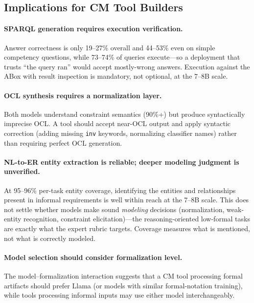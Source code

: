 \documentclass[runningheads]{llncs}
\begin{document}
\subsection{Implications for CM Tool Builders}

\paragraph{SPARQL generation requires execution verification.} Answer correctness is only 19--27\% overall and 44--53\% even on simple competency questions, while 73--74\% of queries execute---so a deployment that trusts ``the query ran'' would accept mostly-wrong answers. Execution against the ABox with result inspection is mandatory, not optional, at the 7--8B scale.

\paragraph{OCL synthesis requires a normalization layer.} Both models understand constraint semantics (90\%+) but produce syntactically imprecise OCL. A tool should accept near-OCL output and apply syntactic correction (adding missing \texttt{inv} keywords, normalizing classifier names) rather than requiring perfect OCL generation.

\paragraph{NL-to-ER entity extraction is reliable; deeper modeling judgment is unverified.} At 95--96\% per-task entity coverage, identifying the entities and relationships present in informal requirements is well within reach at the 7--8B scale. This does not settle whether models make sound \emph{modeling} decisions (normalization, weak-entity recognition, constraint elicitation)---the reasoning-oriented low-formal tasks are exactly what the expert rubric targets. Coverage measures what is mentioned, not what is correctly modeled.

\paragraph{Model selection should consider formalization level.} The model--formalization interaction suggests that a CM tool processing formal artifacts should prefer Llama (or models with similar formal-notation training), while tools processing informal inputs may use either model interchangeably.

\end{document}
